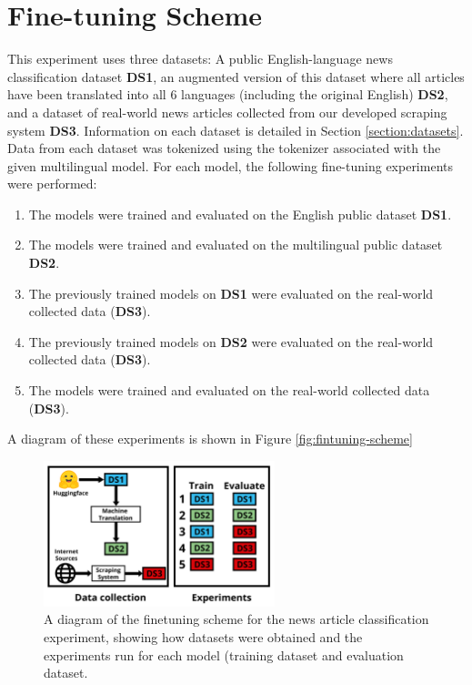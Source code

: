 \documentclass{l4proj}
\begin{document}
\section{Fine-tuning Scheme}
This experiment uses three datasets: A public English-language news classification dataset \textbf{DS1}, an augmented version of this dataset where all articles have been translated into all 6 languages (including the original English) \textbf{DS2}, and a dataset of real-world news articles collected from our developed scraping system \textbf{DS3}. 
Information on each dataset is detailed in Section \ref{section:datasets}. Data from each dataset was tokenized using the tokenizer associated with the given multilingual model. For each model, the following fine-tuning experiments were performed:
\begin{enumerate}
    \item The models were trained and evaluated on the English public dataset \textbf{DS1}. 
    \item The models were trained and evaluated on the multilingual public dataset \textbf{DS2}.
    \item The previously trained models on \textbf{DS1} were evaluated on the real-world collected data (\textbf{DS3}).
    \item The previously trained models on \textbf{DS2} were evaluated on the real-world collected data (\textbf{DS3}).
    \item The models were trained and evaluated on the real-world collected data (\textbf{DS3}).
\end{enumerate}
A diagram of these experiments is shown in Figure \ref{fig:fintuning-scheme}

\begin{figure}[h]
\centering
\includegraphics[width=0.6\textwidth]{images/Finetuning Scheme.png}
\caption{A diagram of the finetuning scheme for the news article classification experiment, showing how datasets were obtained and the experiments run for each model (training dataset and evaluation dataset.}
\label{fig:bert-finetuning}
\end{figure}
\end{document}
